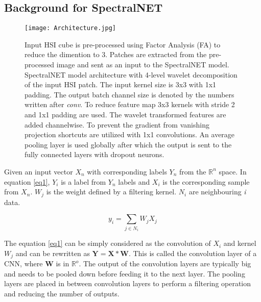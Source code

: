 \documentclass[journal]{IEEEtran}
\newcommand{\R}{\mathbb{R}}
\begin{document}
\subsection{Background for SpectralNET}

\begin{figure*}[!tb]
    \centering
    \texttt{[image: Architecture.jpg]}
    \caption{Input HSI cube is pre-processed using Factor Analysis (FA) to reduce the dimention to 3. Patches are extracted from the pre-processed image and sent as an input to the SpectralNET model. SpectralNET model architecture with 4-level wavelet decomposition of the input HSI patch. The input kernel size is 3x3 with 1x1 padding. The output batch channel size is denoted by the numbers written after \textit{conv}. To reduce feature map 3x3 kernels with stride 2 and 1x1 padding are used. The wavelet transformed features are added channelwise. To prevent the gradient from vanishing projection shortcuts are utilized with 1x1 convolutions. An average pooling layer is used globally after which the output is sent to the fully connected layers with dropout neurons.}
    \label{fig:architecture}
\end{figure*}

Given an input vector $X_n$ with corresponding labels $Y_n$ from the $\R^n$ space. In equation \ref{eq1}, $Y_i$ is a label from $\mathit{Y_n}$ labels and $X_i$ is the corresponding sample from $\mathit{X_n}$. $W_j$ is the weight defined by a filtering kernel. $N_i$ are neighbouring \textit{i} data.   

\begin{equation}
    y_i =  \sum_{j\in N_i} W_j X_j 
    \label{eq1}
\end{equation}

The equation \ref{eq1} can be simply considered as the convolution of $X_i$ and kernel $W_j$ and can be rewritten as $\mathbf{Y = X*W}$. This is called the convolution layer of a CNN, where $\mathbf{W}$ is in $\R^o$. The output of the convolution layers are typically big and needs to be pooled down before feeding it to the next layer. The pooling layers are placed in between convolution layers to perform a filtering operation and reducing the number of outputs. 

\end{document}
